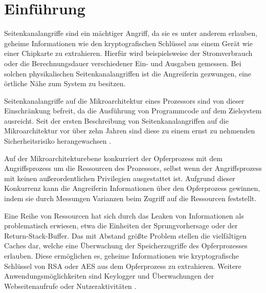 \chapter{Einführung}
\label{chapter:introduction}


Seitenkanalangriffe sind ein mächtiger Angriff, da sie es unter anderem erlauben, geheime Informationen wie den kryptografischen Schlüssel aus einem Gerät wie einer Chipkarte zu extrahieren.
Hierfür wird beispielsweise der Stromverbrauch oder die Berechnungsdauer verschiedener Ein- und Ausgaben gemessen.
Bei solchen physikalischen Seitenkanalangriffen ist die Angreiferin gezwungen, eine örtliche Nähe zum System zu besitzen.

Seitenkanalangriffe auf die Mikroarchitektur eines Prozessors sind von dieser Einschränkung befreit, da die
Ausführung von Programmcode %
auf dem Zielsystem ausreicht.
Seit der ersten Beschreibung von Seitenkanalangriffen auf die Mikroarchitektur vor über zehn Jahren \cite{FirstCacheAttackDES} sind diese zu einem ernst zu nehmenden Sicherheitsrisiko herangewachsen \cite{OpenBSDHyperthreading}.

Auf der Mikroarchitekturebene konkurriert der Opferprozess mit dem Angriffsprozess um die Ressourcen des Prozessors, selbst wenn der Angriffsprozess mit keinen außerordentlichen Privilegien ausgestattet ist.
Aufgrund dieser Konkurrenz kann die Angreiferin %
Informationen über den Opferprozess gewinnen, indem sie durch Messungen Varianzen beim Zugriff auf die Ressourcen feststellt.

Eine Reihe von Ressourcen hat sich durch das Leaken von Informationen als problematisch erwiesen, etwa die Einheiten der Sprungvorhersage oder der Return-Stack-Buffer.
Das mit Abstand größte Problem stellen die vielfältigen Caches dar, welche eine Überwachung der Speicherzugriffe des Opferprozesses erlauben.
Diese ermöglichen es, geheime Informationen wie kryptografische Schlüssel von RSA \cite{CacheBleedOpenSSLRSA} oder AES \cite{BernsteinAES} aus dem Opferprozess zu extrahieren.
Weitere Anwendungsmöglichkeiten sind Keylogger \cite{Keylogger} und Überwachungen der Webseitenaufrufe oder Nutzeraktivitäten \cite{TheSpyInTheSandbox}.

